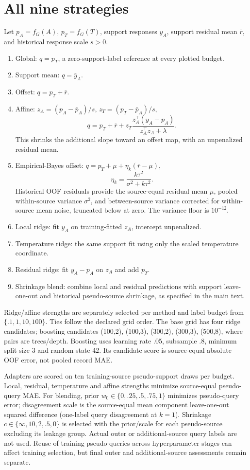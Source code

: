 \documentclass[11pt]{article}
\begin{document}
\section{All nine strategies}
Let $p_A=f_G(A)$, $p_T=f_G(T)$, support responses $y_A$, support residual mean $\bar r$, and historical response scale $s>0$.
\begin{enumerate}
\item Global: $q=p_T$, a zero-support-label reference at every plotted budget.
\item Support mean: $q=\bar y_A$.
\item Offset: $q=p_T+\bar r$.
\item Affine: $z_A=(p_A-\bar p_A)/s$, $z_T=(p_T-\bar p_A)/s$,
\[q=p_T+\bar r+z_T\frac{z_A^\top(y_A-p_A)}{z_A^\top z_A+\lambda}.\]
This shrinks the additional slope toward an offset map, with an unpenalized residual mean.
\item Empirical-Bayes offset: $q=p_T+\mu+\eta_k(\bar r-\mu)$,
\[\eta_k=\frac{k\tau^2}{\sigma^2+k\tau^2}.\]
Historical OOF residuals provide the source-equal residual mean $\mu$, pooled within-source variance $\sigma^2$, and between-source variance corrected for within-source mean noise, truncated below at zero. The variance floor is $10^{-12}$.
\item Local ridge: fit $y_A$ on training-fitted $z_A$, intercept unpenalized.
\item Temperature ridge: the same support fit using only the scaled temperature coordinate.
\item Residual ridge: fit $y_A-p_A$ on $z_A$ and add $p_T$.
\item Shrinkage blend: combine local and residual predictions with support leave-one-out and historical pseudo-source shrinkage, as specified in the main text.
\end{enumerate}
Ridge/affine strengths are separately selected per method and label budget from $\{.1,1,10,100\}$. Ties follow the declared grid order. The base grid has four ridge candidates; boosting candidates (100,2), (100,3), (300,2), (300,3), (500,8), where pairs are trees/depth. Boosting uses learning rate .05, subsample .8, minimum split size 3 and random state 42. Its candidate score is source-equal absolute OOF error, not pooled record MAE.

Adapters are scored on ten training-source pseudo-support draws per budget. Local, residual, temperature and affine strengths minimize source-equal pseudo-query MAE. For blending, prior $w_0\in\{0,.25,.5,.75,1\}$ minimizes pseudo-query error; disagreement scale is the source-equal mean component leave-one-out squared difference (one-label query disagreement at $k=1$). Shrinkage $c\in\{\infty,10,2,.5,0\}$ is selected with the prior/scale for each pseudo-source excluding its leakage group. Actual outer or additional-source query labels are not used. Reuse of training pseudo-queries across hyperparameter stages can affect training selection, but final outer and additional-source assessments remain separate.
\end{document}
